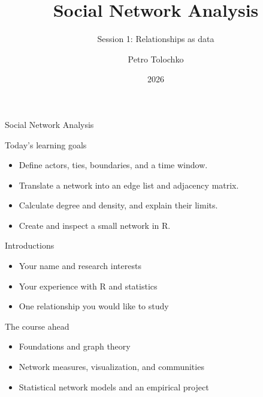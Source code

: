 \documentclass[aspectratio=169,11pt]{beamer}
\title{Social Network Analysis}
\subtitle{Session 1: Relationships as data}
\author{Petro Tolochko}
\institute{University of Vienna\\Advanced Data Analysis III}
\date{2026}
\begin{document}
\begin{frame}{Social Network Analysis}
\titlepage
{}
\end{frame}

\begin{frame}{Today's learning goals}
\begin{itemize}
\item Define actors, ties, boundaries, and a time window.
\medskip
\item Translate a network into an edge list and adjacency matrix.
\medskip
\item Calculate degree and density, and explain their limits.
\medskip
\item Create and inspect a small network in R.
\medskip
\end{itemize}

\end{frame}

\begin{frame}{Introductions}
\begin{itemize}
\item Your name and research interests
\medskip
\item Your experience with R and statistics
\medskip
\item One relationship you would like to study
\medskip
\end{itemize}

\end{frame}

\begin{frame}{The course ahead}
\begin{itemize}
\item Foundations and graph theory
\medskip
\item Network measures, visualization, and communities
\medskip
\item Statistical network models and an empirical project
\medskip
\end{itemize}

\end{frame}
\end{document}

